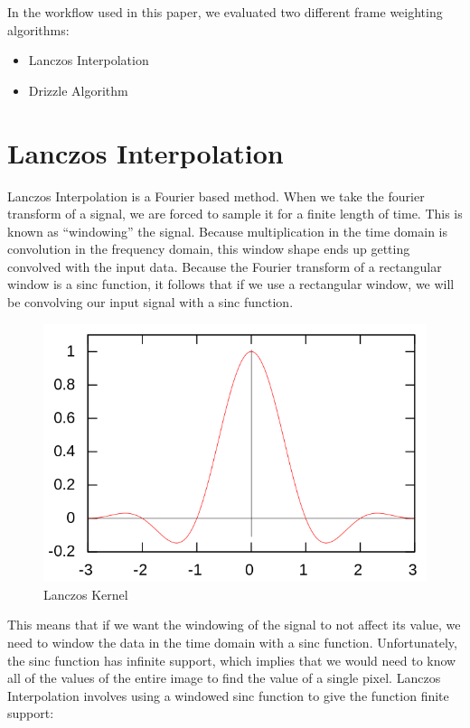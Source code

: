 \documentclass[conference]{IEEEtran}
\newcommand{\centerimage}[3]{
\begin{figure}[!h]  
\centering
#1
\caption{#2}
\label{#3}
\end{figure}}
\begin{document}
In the workflow used in this paper, we evaluated two different
frame weighting algorithms:

\begin{itemize}
\item Lanczos Interpolation\cite{lanczos}
\item Drizzle Algorithm\cite{drizzle}
\end{itemize}

\section{Lanczos Interpolation}

Lanczos Interpolation is a Fourier based method. When we take the
fourier transform of a signal, we are forced to sample it for a finite
length of time. This is known as ``windowing'' the signal. Because
multiplication in the time domain is convolution in the frequency
domain, this window shape ends up getting convolved with the input
data. Because the Fourier transform of a rectangular window is a sinc
function, it follows that if we use a rectangular window, we will be
convolving our input signal with a sinc function.

\centerimage{\includegraphics[width=0.9\columnwidth]{img/Lanczos-kernel.png}}{Lanczos Kernel}{fig:lanczos}

This means that if we want the windowing of the signal to not affect
its value, we need to window the data in the time domain with a sinc
function. Unfortunately, the sinc function has infinite support, which
implies that we would need to know all of the values of the entire
image to find the value of a single pixel. Lanczos Interpolation
involves using a windowed sinc function to give the function finite support:
\end{document}
